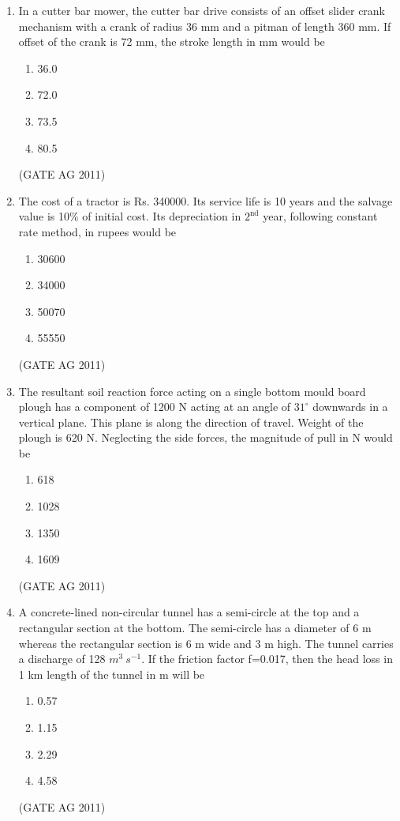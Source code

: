 \documentclass[journal,12pt,onecolumn]{IEEEtran}
\theoremstyle{remark}
\begin{document}
\begin{enumerate}
\item In a cutter bar mower, the cutter bar drive consists of an offset slider crank mechanism with a crank of radius 36 mm and a pitman of length 360 mm.  
If offset of the crank is 72 mm, the stroke length in mm would be
\begin{multicols}{4}
\begin{enumerate}
\item 36.0
\item 72.0
\item 73.5
\item 80.5
\end{enumerate}
\end{multicols}
\hfill{(GATE AG 2011)}

\item The cost of a tractor is Rs. 340000. Its service life is 10 years and the salvage value is 10\% of initial cost.  
Its depreciation in $2^{\mathrm{nd}}$ year, following constant rate method, in rupees would be
\begin{multicols}{4}
\begin{enumerate}
\item 30600
\item 34000
\item 50070
\item 55550
\end{enumerate}
\end{multicols}
\hfill{(GATE AG 2011)}

\item The resultant soil reaction force acting on a single bottom mould board plough has a component of 1200 N acting at an angle of $31^\circ$ downwards in a vertical plane.  
This plane is along the direction of travel. Weight of the plough is 620 N.  
Neglecting the side forces, the magnitude of pull in N would be
\begin{multicols}{4}
\begin{enumerate}
\item 618
\item 1028
\item 1350
\item 1609
\end{enumerate}
\end{multicols}
\hfill{(GATE AG 2011)}

\item A concrete-lined non-circular tunnel has a semi-circle at the top and a rectangular section at the bottom.  
The semi-circle has a diameter of 6 m whereas the rectangular section is 6 m wide and 3 m high.  
The tunnel carries a discharge of 128 ${m^3\ s^{-1}}$.  
If the friction factor f=0.017, then the head loss in 1 km length of the tunnel in m will be
\begin{multicols}{4}
\begin{enumerate}
\item 0.57
\item 1.15
\item 2.29
\item 4.58
\end{enumerate}
\end{multicols}
\hfill{(GATE AG 2011)}


\end{enumerate}
\end{document}
